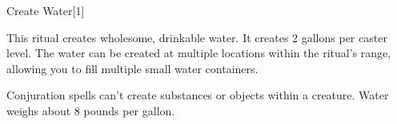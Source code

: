 \begin{spellsection}{Create Water}[1]
    \begin{spellheader}
    \end{spellheader}
    \begin{spellcontent}
        \begin{spelltargetinginfo}
            \spellrng{\rngclose}
        \end{spelltargetinginfo}
        \begin{spelleffects}

            \spelleffect This ritual creates wholesome, drinkable water. It creates 2 gallons per caster level. The water can be created at multiple locations within the ritual's range, allowing you to fill multiple small water containers.
        \end{spelleffects}
    \end{spellcontent}
    \begin{spellfooter}
        \spellnotes Conjuration spells can't create substances or objects within a creature. Water weighs about 8 pounds per gallon.
    \end{spellfooter}
\end{spellsection}

